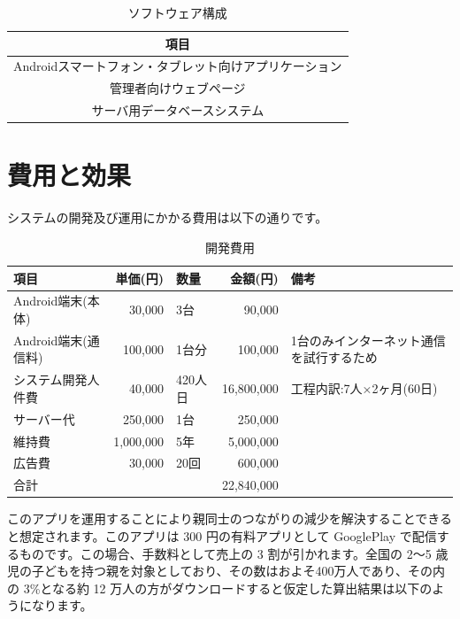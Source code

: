 \documentclass[a4j]{jarticle}
\begin{document}
\begin{table}[H]
    \caption{ソフトウェア構成}
    \label{tbl: table_software}
    \begin{center}
        \begin{tabular}{|c|} \hline
            項目 \\ \hline \hline
            Androidスマートフォン・タブレット向けアプリケーション \\ \hline
            管理者向けウェブページ \\ \hline
            サーバ用データベースシステム \\ \hline
        \end{tabular}
    \end{center}
\end{table}

\section{費用と効果}
システムの開発及び運用にかかる費用は以下の通りです。
　\begin{table}[H]
\begin{center}
  \caption{開発費用}
  \begin{tabular}{|l|r|l|r|l|}\hline
    項目& 単価(円) & 数量 & 金額(円) & 備考  \\ \hline \hline
    Android端末(本体)& 30,000 & 3台 & 90,000 & 　 \\ \hline
    Android端末(通信料)& 100,000 & 1台分 & 100,000 & 1台のみインターネット通信を試行するため  \\ \hline
    システム開発人件費& 40,000 & 420人日 & 16,800,000 & 工程内訳:7人×2ヶ月(60日)  \\ \hline
    サーバー代& 250,000 & 1台 & 250,000 & 　 \\ \hline
    維持費& 1,000,000 & 5年 & 5,000,000 & 　　  \\ \hline
    広告費& 30,000 & 20回 & 600,000 & 　　  \\ \hline
    \multicolumn{3}{|l|}{合計} & 22,840,000 &　 \\ \hline
  \end{tabular}
\end{center}
\end{table}

このアプリを運用することにより親同士のつながりの減少を解決することできると想定されます。このアプリは 300 円の有料アプリとして GooglePlay で配信するものです。この場合、手数料として売上の 3 割が引かれます。全国の 2～5 歳児の子どもを持つ親を対象としており、その数はおよそ400万人であり、その内の 3\%となる約 12 万人の方がダウンロードすると仮定した算出結果は以下のようになります。
\end{document}
